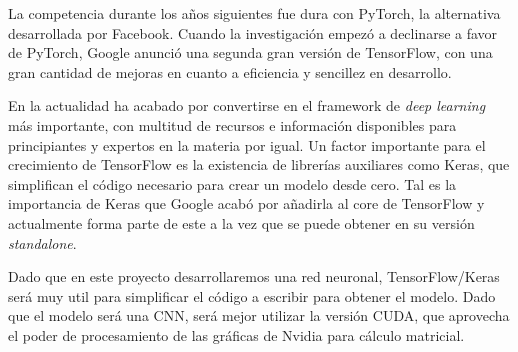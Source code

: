 La competencia durante los años siguientes fue dura con PyTorch, la alternativa desarrollada por Facebook. Cuando la investigación empezó a declinarse a favor de PyTorch, Google anunció una segunda gran versión de TensorFlow, con una gran cantidad de mejoras en cuanto a eficiencia y sencillez en desarrollo. 

En la actualidad ha acabado por convertirse en el framework de \textit{deep learning} más importante, con multitud de recursos e información disponibles para principiantes y expertos en la materia por igual. Un factor importante para el crecimiento de TensorFlow es la existencia de librerías auxiliares como Keras, que simplifican el código necesario para crear un modelo desde cero. Tal es la importancia de Keras que Google acabó por añadirla al core de TensorFlow y actualmente forma parte de este a la vez que se puede obtener en su versión \textit{standalone}.

Dado que en este proyecto desarrollaremos una red neuronal, TensorFlow/Keras será muy util para simplificar el código a escribir para obtener el modelo. Dado que el modelo será una CNN, será mejor utilizar la versión CUDA, que aprovecha el poder de procesamiento de las gráficas de Nvidia para cálculo matricial.

\newpage